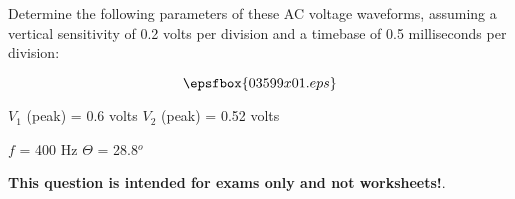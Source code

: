 

Determine the following parameters of these AC voltage waveforms, assuming a vertical sensitivity of 0.2 volts per division and a timebase of 0.5 milliseconds per division:

$$\epsfbox{03599x01.eps}$$







$V_{1}$ (peak) = 0.6 volts \hskip 100pt $V_{2}$ (peak) = 0.52 volts

\vskip 10pt

$f$ = 400 Hz \hskip 100pt $\Theta$ = 28.8$^{o}$







{\bf This question is intended for exams only and not worksheets!}.



